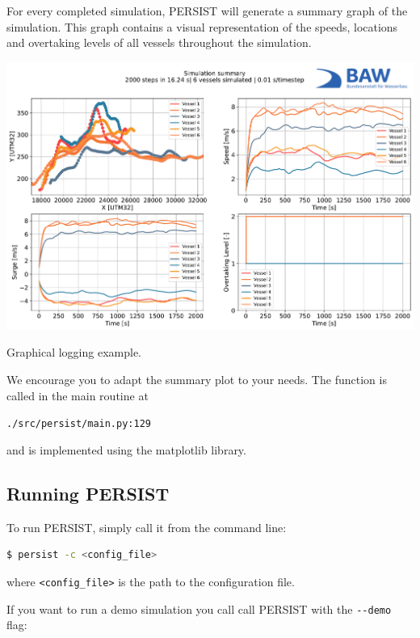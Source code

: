 \documentclass[
	a4paper, %
	12pt, %
]{persist}
\begin{document}
For every completed simulation, PERSIST will generate a summary graph of the simulation. This graph contains a visual representation of the speeds, locations and overtaking levels of all vessels throughout the simulation.
\begin{marginfigure}
	\includegraphics[width=\linewidth]{img/summary.pdf}
	\caption{Graphical logging example.}
	\label{fig:graph}
\end{marginfigure}

We encourage you to adapt the summary plot to your needs. The function is called in the main routine at 

\verb|./src/persist/main.py:129|

and is implemented using the matplotlib library.

\subsection{Running PERSIST}

To run PERSIST, simply call it from the command line:

\begin{lstlisting}[language=bash]
	$ persist -c <config_file>
\end{lstlisting}

where \verb|<config_file>| is the path to the configuration file.

If you want to run a demo simulation you call call PERSIST with the \verb|--demo| flag:
\end{document}

